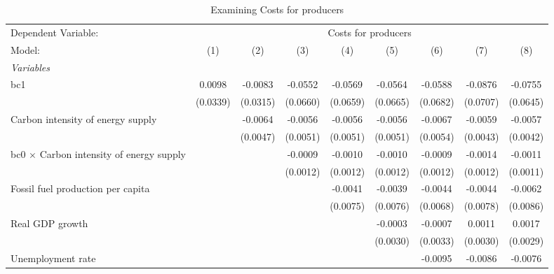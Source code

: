 
\begin{table}[htbp]
   \caption{Examining Costs for producers}
   \centering
   \begin{tabular}{lcccccccc}
      \tabularnewline \midrule \midrule
      Dependent Variable: & \multicolumn{8}{c}{Costs for producers}\\
      Model:                                          & (1)      & (2)      & (3)      & (4)      & (5)      & (6)      & (7)      & (8)\\  
      \midrule
      \emph{Variables}\\
      bc1                                             & 0.0098   & -0.0083  & -0.0552  & -0.0569  & -0.0564  & -0.0588  & -0.0876  & -0.0755\\   
                                                      & (0.0339) & (0.0315) & (0.0660) & (0.0659) & (0.0665) & (0.0682) & (0.0707) & (0.0645)\\   
      Carbon intensity of energy supply               &          & -0.0064  & -0.0056  & -0.0056  & -0.0056  & -0.0067  & -0.0059  & -0.0057\\   
                                                      &          & (0.0047) & (0.0051) & (0.0051) & (0.0051) & (0.0054) & (0.0043) & (0.0042)\\   
      bc0 $\times$ Carbon intensity of energy supply  &          &          & -0.0009  & -0.0010  & -0.0010  & -0.0009  & -0.0014  & -0.0011\\   
                                                      &          &          & (0.0012) & (0.0012) & (0.0012) & (0.0012) & (0.0012) & (0.0011)\\   
      Fossil fuel production per capita               &          &          &          & -0.0041  & -0.0039  & -0.0044  & -0.0044  & -0.0062\\   
                                                      &          &          &          & (0.0075) & (0.0076) & (0.0068) & (0.0078) & (0.0086)\\   
      Real GDP growth                                 &          &          &          &          & -0.0003  & -0.0007  & 0.0011   & 0.0017\\   
                                                      &          &          &          &          & (0.0030) & (0.0033) & (0.0030) & (0.0029)\\   
      Unemployment rate                               &          &          &          &          &          & -0.0095  & -0.0086  & -0.0076\\   

\end{tabular}
\end{table}
